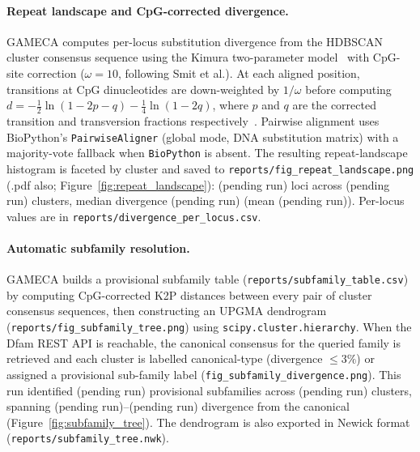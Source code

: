\documentclass[11pt]{article}
\providecommand{\divNloci}{(pending run)}\providecommand{\divNClusters}{(pending run)}
\providecommand{\divMedianAll}{(pending run)}\providecommand{\divMeanAll}{(pending run)}
\providecommand{\subfamNClusters}{(pending run)}\providecommand{\subfamNSubfamilies}{(pending run)}
\providecommand{\subfamMinDiv}{(pending run)}\providecommand{\subfamMaxDiv}{(pending run)}
\begin{document}
\paragraph{Repeat landscape and CpG-corrected divergence.}
GAMECA computes per-locus substitution divergence from the HDBSCAN cluster consensus
sequence using the Kimura two-parameter model~\citep{kimura1980} with CpG-site
correction ($\omega = 10$, following Smit et al.).  At each aligned position,
transitions at CpG dinucleotides are down-weighted by $1/\omega$ before computing
$d = -\tfrac{1}{2}\ln(1 - 2p - q) - \tfrac{1}{4}\ln(1 - 2q)$, where $p$ and $q$ are
the corrected transition and transversion fractions respectively~\citep{kimura1980}.
Pairwise alignment uses BioPython's \texttt{PairwiseAligner} (global mode, DNA
substitution matrix) with a majority-vote fallback when \texttt{BioPython} is absent.
The resulting repeat-landscape histogram is faceted by cluster and saved to
\texttt{reports/fig\_repeat\_landscape.png} (.pdf also; Figure~\ref{fig:repeat_landscape}):
\divNloci{} loci across \divNClusters{} clusters, median divergence \divMedianAll{}
(mean \divMeanAll).  Per-locus values are in \texttt{reports/divergence\_per\_locus.csv}.

\paragraph{Automatic subfamily resolution.}
GAMECA builds a provisional subfamily table (\texttt{reports/subfamily\_table.csv})
by computing CpG-corrected K2P distances between every pair of cluster consensus
sequences, then constructing an UPGMA dendrogram (\texttt{reports/fig\_subfamily\_tree.png})
using \texttt{scipy.cluster.hierarchy}.  When the Dfam REST API is reachable, the
canonical consensus for the queried family is retrieved and each cluster is labelled
canonical-type (divergence $\leq 3\%$) or assigned a provisional sub-family label
(\texttt{fig\_subfamily\_divergence.png}).  This run identified \subfamNSubfamilies{}
provisional subfamilies across \subfamNClusters{} clusters, spanning
\subfamMinDiv--\subfamMaxDiv{} divergence from the canonical
(Figure~\ref{fig:subfamily_tree}).  The dendrogram is also exported in Newick
format (\texttt{reports/subfamily\_tree.nwk}).
\end{document}
